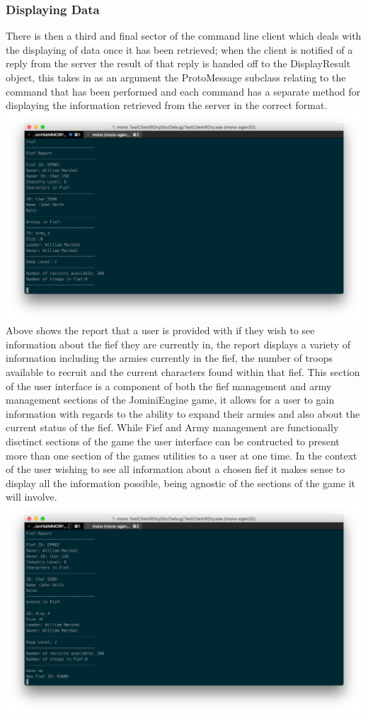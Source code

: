 \documentclass{article}
\begin{document}
\subsubsection{Displaying Data}
There is then a third and final sector of the command line client which deals with the displaying of data once it has been retrieved; when the client is notified of a reply from the server the result of that reply is handed off to the DisplayResult object, this takes in as an argument the ProtoMessage subclass relating to the command that has been performed and each command has a separate method for displaying the information retrieved from the server in the correct format.\\
\includegraphics[width=\textwidth]{text3.png}
Above shows the report that a user is provided with if they wish to see information about the fief they are currently in, the report displays a variety of information including the armies currently in the fief, the number of troops available to recruit and the current characters found within that fief. This section of the user interface is a component of both the fief management and army management sections of the JominiEngine game, it allows for a user to gain information with regards to the ability to expand their armies and also about the current status of the fief. While Fief and Army management are functionally disctinct sections of the game the user interface can be contructed to present more than one section of the games utilities to a user at one time. In the context of the user wishing to see all information about a chosen fief it makes sense to display all the information possible, being agnostic of the sections of the game it will involve.\\
\includegraphics[width=\textwidth]{text4.png}
\end{document}
